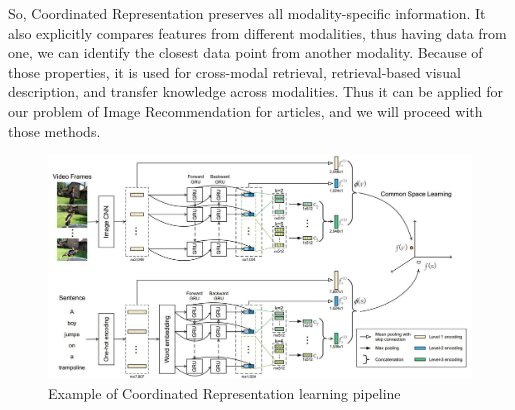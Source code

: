 So, Coordinated Representation preserves all modality-specific information. It also explicitly compares features from different modalities, thus having data from one, we can identify the closest data point from another modality. Because of those properties, it is used for cross-modal retrieval\cite{ref_wang}, retrieval-based visual description\cite{ref_socher}, and transfer knowledge across
\newline
modalities\cite{ref_pan}. Thus it can be applied for our problem of Image Recommendation for articles, and we will proceed with those methods.

\begin{figure}
\includegraphics[width=\textwidth]{Resources/dual_encoding.jpg}
\caption{Example of Coordinated Representation learning pipeline\cite{ref_dual_encoding}} \label{fig2}
\end{figure}

\endinput